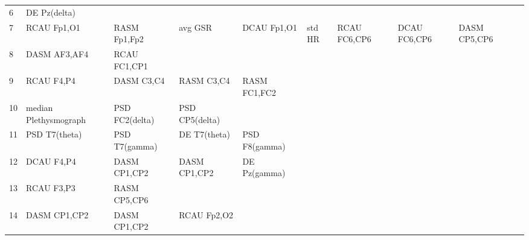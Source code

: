 \begin{landscape}
\begin{table}[]
\begin{tabular}{l|llllllll}
6        & DE Pz(delta)          &                       &                      &                         &                         &                      &                      &                       &                       &                    \\
7        & RCAU Fp1,O1           & RASM Fp1,Fp2          & avg GSR              & DCAU Fp1,O1             & std HR                  & RCAU FC6,CP6         & DCAU FC6,CP6         & DASM CP5,CP6          &                       &                    \\
8        & DASM AF3,AF4          & RCAU FC1,CP1          &                      &                         &                         &                      &                      &                       &                       &                    \\
9        & RCAU F4,P4            & DASM C3,C4            & RASM C3,C4           & RASM FC1,FC2            &                         &                      &                      &                       &                       &                    \\
10       & median Plethysmograph & PSD FC2(delta)        & PSD CP5(delta)       &                         &                         &                      &                      &                       &                       &                    \\
11       & PSD T7(theta)         & PSD T7(gamma)         & DE T7(theta)         & PSD F8(gamma)           &                         &                      &                      &                       &                       &                    \\
12       & DCAU F4,P4            & DASM CP1,CP2          & DASM CP1,CP2         & DE Pz(gamma)            &                         &                      &                      &                       &                       &                    \\
13       & RCAU F3,P3            & RASM CP5,CP6          &                      &                         &                         &                      &                      &                       &                       &                    \\
14       & DASM CP1,CP2          & DASM CP1,CP2          & RCAU Fp2,O2          &                         &                         &                      &                      &                       &                       &                    \\

\end{tabular}
\end{table}
\end{landscape}
